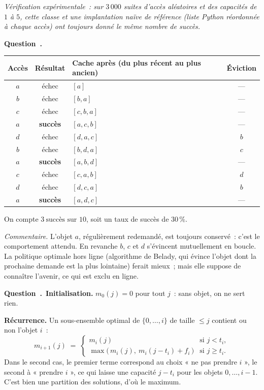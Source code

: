 \documentclass[11pt,a4paper]{article}
\renewcommand{\Q}{\medskip\par\stepcounter{qcnt}\noindent\textbf{\color{cnc}Question~\theqcnt.}~}
\begin{document}
\emph{Vérification expérimentale~: sur $3\,000$ suites d'accès aléatoires et des capacités de
$1$ à $5$, cette classe et une implantation naïve de référence (liste Python réordonnée à
chaque accès) ont toujours donné le même nombre de succès.}

\Q
\begin{center}\small
\begin{tabular}{c|c|l|c}
Accès & Résultat & Cache après (du plus récent au plus ancien) & Éviction\\\hline
$a$ & échec & $[a]$ & ---\\
$b$ & échec & $[b,a]$ & ---\\
$c$ & échec & $[c,b,a]$ & ---\\
$a$ & \textbf{succès} & $[a,c,b]$ & ---\\
$d$ & échec & $[d,a,c]$ & $b$\\
$b$ & échec & $[b,d,a]$ & $c$\\
$a$ & \textbf{succès} & $[a,b,d]$ & ---\\
$c$ & échec & $[c,a,b]$ & $d$\\
$d$ & échec & $[d,c,a]$ & $b$\\
$a$ & \textbf{succès} & $[a,d,c]$ & ---
\end{tabular}
\end{center}
On compte $\boxed{3\ \text{succès sur }10}$, soit un taux de succès de $30\,\%$.

\emph{Commentaire.} L'objet $a$, régulièrement redemandé, est toujours conservé~: c'est le
comportement attendu. En revanche $b$, $c$ et $d$ s'évincent mutuellement en boucle. La
politique optimale hors ligne (algorithme de Belady, qui évince l'objet dont la prochaine
demande est la plus lointaine) ferait mieux~; mais elle suppose de connaître l'avenir, ce qui
est exclu en ligne.

\Q \textbf{Initialisation.} $m_0(j)=0$ pour tout $j$~: sans objet, on ne sert rien.

\textbf{Récurrence.} Un sous-ensemble optimal de $\{0,\dots,i\}$ de taille $\le j$ contient
ou non l'objet $i$~:
\[ m_{i+1}(j) \;=\;
\begin{cases}
m_i(j) & \text{si } j<t_i,\\[3pt]
\max\big(\,m_i(j),\ m_i(j-t_i)+f_i\,\big) & \text{si } j\ge t_i .
\end{cases} \]
Dans le second cas, le premier terme correspond au choix « ne pas prendre $i$ », le second à
« prendre $i$ », ce qui laisse une capacité $j-t_i$ pour les objets $0,\dots,i-1$. C'est bien
une partition des solutions, d'où le maximum.
\end{document}

